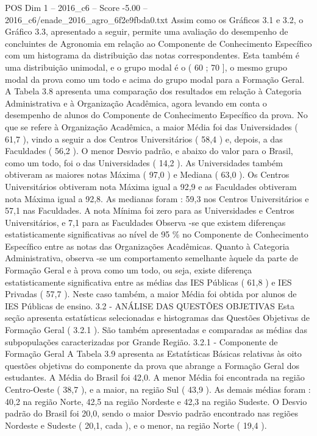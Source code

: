 \begin{textsample}{POS Dim 1 – 2016\_c6 – Score -5.00 – 2016\_c6/enade\_2016\_agro\_6f2e9fbda0.txt}
Assim como os Gráficos 3.1 e 3.2, o Gráfico 3.3, apresentado a seguir, permite uma avaliação do desempenho de concluintes de Agronomia em relação ao Componente de Conhecimento Específico com um histograma da distribuição das notas correspondentes.
Esta também é uma distribuição unimodal, e o grupo modal é o ( 60 ; 70 ], o mesmo grupo modal da prova como um todo e acima do grupo modal para a Formação Geral.
A Tabela 3.8 apresenta uma comparação dos resultados em relação à Categoria Administrativa e à Organização Acadêmica, agora levando em conta o desempenho de alunos do Componente de Conhecimento Específico da prova.
No que se refere à Organização Acadêmica, a maior Média foi das Universidades ( 61,7 ), vindo a seguir a dos Centros Universitários ( 58,4 ) e, depois, a das Faculdades ( 56,2 ).
O menor Desvio padrão, e abaixo do valor para o Brasil, como um todo, foi o das Universidades ( 14,2 ).
As Universidades também obtiveram as maiores notas Máxima ( 97,0 ) e Mediana ( 63,0 ).
Os Centros Universitários obtiveram nota Máxima igual a 92,9 e as Faculdades obtiveram nota Máxima igual a 92,8.
As medianas foram : 59,3 nos Centros Universitários e 57,1 nas Faculdades.
A nota Mínima foi zero para as Universidades e Centros Universitários, e 7,1 para as Faculdades Observa -se que existem diferenças estatisticamente significativas ao nível de 95 \% no Componente de Conhecimento Específico entre as notas das Organizações Acadêmicas.
Quanto à Categoria Administrativa, observa -se um comportamento semelhante àquele da parte de Formação Geral e à prova como um todo, ou seja, existe diferença estatisticamente significativa entre as médias das IES Públicas ( 61,8 ) e IES Privadas ( 57,7 ).
Neste caso também, a maior Média foi obtida por alunos de IES Públicas de ensino. 3.2 - ANÁLISE DAS QUESTÕES OBJETIVAS Esta seção apresenta estatísticas selecionadas e histogramas das Questões Objetivas de Formação Geral ( 3.2.1 ).
São também apresentadas e comparadas as médias das subpopulações caracterizadas por Grande Região. 3.2.1 - Componente de Formação Geral A Tabela 3.9 apresenta as Estatísticas Básicas relativas às oito questões objetivas do componente da prova que abrange a Formação Geral dos estudantes.
A Média do Brasil foi 42,0.
A menor Média foi encontrada na região Centro-Oeste ( 38,7 ), e a maior, na região Sul ( 43,9 ).
As demais médias foram : 40,2 na região Norte, 42,5 na região Nordeste e 42,3 na região Sudeste.
O Desvio padrão do Brasil foi 20,0, sendo o maior Desvio padrão encontrado nas regiões Nordeste e Sudeste ( 20,1, cada ), e o menor, na região Norte ( 19,4 ).

\end{textsample}

